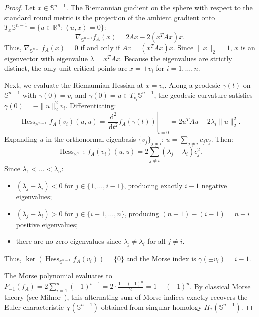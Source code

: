 \documentclass[11pt,a4paper,reqno]{amsart}
\theoremstyle{definition}
\numberwithin{equation}{section}
\providecommand{\R}{\mathbb{R}}
\providecommand{\Sph}{\mathbb{S}}
\newcommand{\inner}[2]{\left\langle #1, #2 \right\rangle}
\newcommand{\dif}{\,\mathrm{d}}
\providecommand{\Sph}{\mathbb{S}}
\providecommand{\R}{\mathbb{R}}
\begin{document}
\begin{proof}
Let $x \in \Sph^{n-1}$. The Riemannian gradient on the sphere with respect to the standard round metric is the projection of the ambient gradient onto $T_x \Sph^{n-1} = \{u \in \R^n \colon \inner{u}{x} = 0\}$:
\begin{equation}
    \nabla_{\Sph^{n-1}} f_A(x) = 2 A x - 2(x^T A x) x.
\end{equation}
Thus, $\nabla_{\Sph^{n-1}} f_A(x) = 0$ if and only if $Ax = (x^T Ax) x$. Since $\|x\|_2=1$, $x$ is an eigenvector with eigenvalue $\lambda = x^T Ax$. Because the eigenvalues are strictly distinct, the only unit critical points are $x = \pm v_i$ for $i=1, \dots, n$.

Next, we evaluate the Riemannian Hessian at $x = v_i$. Along a geodesic $\gamma(t)$ on $\Sph^{n-1}$ with $\gamma(0) = v_i$ and $\dot{\gamma}(0) = u \in T_{v_i} \Sph^{n-1}$, the geodesic curvature satisfies $\ddot{\gamma}(0) = -\|u\|_2^2 v_i$. Differentiating:
\begin{equation}
    \operatorname{Hess}_{\Sph^{n-1}} f_A(v_i)(u, u) = \left.\frac{\dif^2}{\dif t^2} f_A(\gamma(t))\right|_{t=0} = 2 u^T A u - 2 \lambda_i \|u\|_2^2.
\end{equation}
Expanding $u$ in the orthonormal eigenbasis $\{v_j\}_{j \neq i}$: $u = \sum_{j \ne i} c_j v_j$. Then:
\begin{equation}
    \operatorname{Hess}_{\Sph^{n-1}} f_A(v_i)(u, u) = 2 \sum_{j \ne i} (\lambda_j - \lambda_i) c_j^2.
\end{equation}
Since $\lambda_1 < \dots < \lambda_n$:
\begin{itemize}
    \item $(\lambda_j - \lambda_i) < 0$ for $j \in \{1, \dots, i-1\}$, producing exactly $i-1$ negative eigenvalues;
    \item $(\lambda_j - \lambda_i) > 0$ for $j \in \{i+1, \dots, n\}$, producing $(n-1) - (i-1) = n - i$ positive eigenvalues;
    \item there are no zero eigenvalues since $\lambda_j \ne \lambda_i$ for all $j \ne i$.
\end{itemize}
Thus, $\ker(\operatorname{Hess}_{\Sph^{n-1}} f_A(v_i)) = \{0\}$ and the Morse index is $\gamma(\pm v_i) = i - 1$. 

The Morse polynomial evaluates to $P_{-1}(f_A) = 2 \sum_{i=1}^n (-1)^{i-1} = 2 \cdot \frac{1 - (-1)^n}{2} = 1 - (-1)^n$. By classical Morse theory (see Milnor~\cite{milnor1963morse}), this alternating sum of Morse indices exactly recovers the Euler characteristic $\chi(\Sph^{n-1})$ obtained from singular homology $H_*(\Sph^{n-1})$.
\end{proof}
\end{document}
